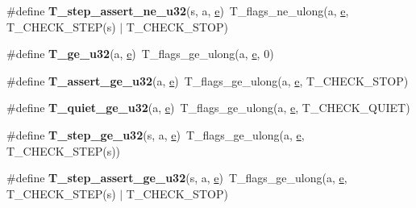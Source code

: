 \begin{DoxyCompactItemize}
\#define {\bfseries T\+\_\+step\+\_\+assert\+\_\+ne\+\_\+u32}(s,  a,  \mbox{\hyperlink{sun4u_2tte_8h_a8b0b9ed08e0e18920ec2682f48228c27}{e}})~T\+\_\+flags\+\_\+ne\+\_\+ulong(a, \mbox{\hyperlink{sun4u_2tte_8h_a8b0b9ed08e0e18920ec2682f48228c27}{e}}, T\+\_\+\+C\+H\+E\+C\+K\+\_\+\+S\+T\+EP(s) $\vert$ T\+\_\+\+C\+H\+E\+C\+K\+\_\+\+S\+T\+OP)
\item 
\mbox{\label{group__RTEMSTestFrameworkChecksUInt32_gafe002e3715ed930858db3396dcf3b60e}} 
\#define {\bfseries T\+\_\+ge\+\_\+u32}(a,  \mbox{\hyperlink{sun4u_2tte_8h_a8b0b9ed08e0e18920ec2682f48228c27}{e}})~T\+\_\+flags\+\_\+ge\+\_\+ulong(a, \mbox{\hyperlink{sun4u_2tte_8h_a8b0b9ed08e0e18920ec2682f48228c27}{e}}, 0)
\item 
\mbox{\label{group__RTEMSTestFrameworkChecksUInt32_gac7172374db19ae10258f3e118a9f9dd2}} 
\#define {\bfseries T\+\_\+assert\+\_\+ge\+\_\+u32}(a,  \mbox{\hyperlink{sun4u_2tte_8h_a8b0b9ed08e0e18920ec2682f48228c27}{e}})~T\+\_\+flags\+\_\+ge\+\_\+ulong(a, \mbox{\hyperlink{sun4u_2tte_8h_a8b0b9ed08e0e18920ec2682f48228c27}{e}}, T\+\_\+\+C\+H\+E\+C\+K\+\_\+\+S\+T\+OP)
\item 
\mbox{\label{group__RTEMSTestFrameworkChecksUInt32_ga1ddbe19cabc283ad27447366bc9aa073}} 
\#define {\bfseries T\+\_\+quiet\+\_\+ge\+\_\+u32}(a,  \mbox{\hyperlink{sun4u_2tte_8h_a8b0b9ed08e0e18920ec2682f48228c27}{e}})~T\+\_\+flags\+\_\+ge\+\_\+ulong(a, \mbox{\hyperlink{sun4u_2tte_8h_a8b0b9ed08e0e18920ec2682f48228c27}{e}}, T\+\_\+\+C\+H\+E\+C\+K\+\_\+\+Q\+U\+I\+ET)
\item 
\mbox{\label{group__RTEMSTestFrameworkChecksUInt32_gad6973dc0cf48979ff3d1075f96bf27a1}} 
\#define {\bfseries T\+\_\+step\+\_\+ge\+\_\+u32}(s,  a,  \mbox{\hyperlink{sun4u_2tte_8h_a8b0b9ed08e0e18920ec2682f48228c27}{e}})~T\+\_\+flags\+\_\+ge\+\_\+ulong(a, \mbox{\hyperlink{sun4u_2tte_8h_a8b0b9ed08e0e18920ec2682f48228c27}{e}}, T\+\_\+\+C\+H\+E\+C\+K\+\_\+\+S\+T\+EP(s))
\item 
\mbox{\label{group__RTEMSTestFrameworkChecksUInt32_ga75466275991c8b37073b3c2f1891cd8b}} 
\#define {\bfseries T\+\_\+step\+\_\+assert\+\_\+ge\+\_\+u32}(s,  a,  \mbox{\hyperlink{sun4u_2tte_8h_a8b0b9ed08e0e18920ec2682f48228c27}{e}})~T\+\_\+flags\+\_\+ge\+\_\+ulong(a, \mbox{\hyperlink{sun4u_2tte_8h_a8b0b9ed08e0e18920ec2682f48228c27}{e}}, T\+\_\+\+C\+H\+E\+C\+K\+\_\+\+S\+T\+EP(s) $\vert$ T\+\_\+\+C\+H\+E\+C\+K\+\_\+\+S\+T\+OP)

\end{DoxyCompactItemize}
